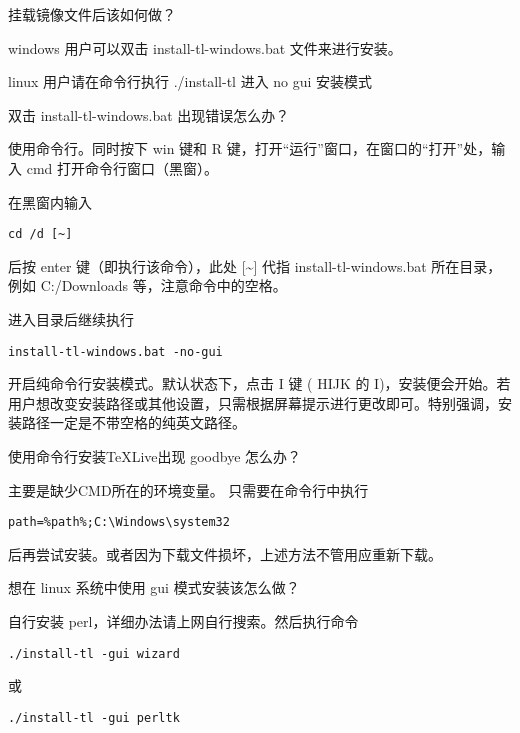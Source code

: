 \begin{faq}{挂载镜像文件后该如何做？}

windows 用户可以双击 install-tl-windows.bat 文件来进行安装。

linux 用户请在命令行执行 ./install-tl 进入 no gui 安装模式
\end{faq}


\begin{faq}{双击 install-tl-windows.bat 出现错误怎么办？}

使用命令行。同时按下 win 键和 R
键，打开``运行''窗口，在窗口的``打开''处，输入 cmd
打开命令行窗口（黑窗）。

在黑窗内输入

\begin{verbatim}
cd /d [~]
\end{verbatim}

后按 enter 键（即执行该命令），此处 {[}\textasciitilde{}{]} 代指
install-tl-windows.bat 所在目录，例如 C:/Downloads
等，注意命令中的空格。

进入目录后继续执行

\begin{verbatim}
install-tl-windows.bat -no-gui
\end{verbatim}

开启纯命令行安装模式。默认状态下，点击 I 键 ( HIJK 的
I)，安装便会开始。若用户想改变安装路径或其他设置，只需根据屏幕提示进行更改即可。特别强调，安装路径一定是不带空格的纯英文路径。
\end{faq}


\begin{faq}{使用命令行安装TeXLive出现 goodbye 怎么办？}

主要是缺少CMD所在的环境变量。 只需要在命令行中执行

\begin{verbatim}
path=%path%;C:\Windows\system32
\end{verbatim}

后再尝试安装。或者因为下载文件损坏，上述方法不管用应重新下载。
\end{faq}


\begin{faq}{想在 linux 系统中使用 gui 模式安装该怎么做？}

自行安装 perl，详细办法请上网自行搜索。然后执行命令

\begin{verbatim}
./install-tl -gui wizard
\end{verbatim}

或

\begin{verbatim}
./install-tl -gui perltk
\end{verbatim}
\end{faq}


